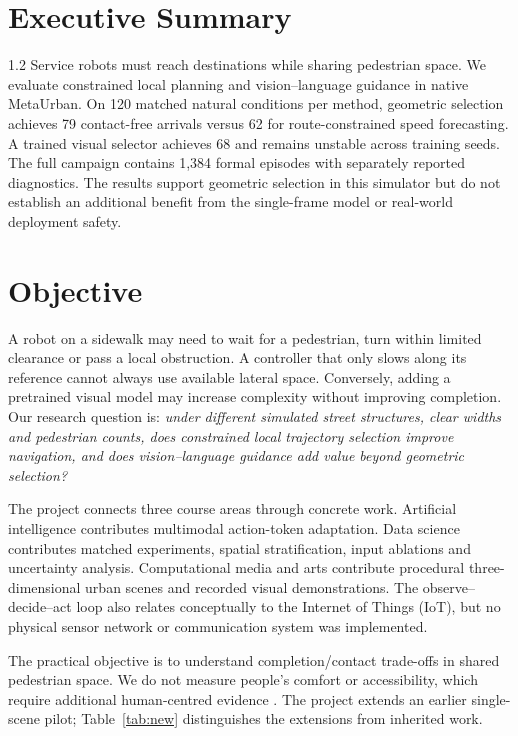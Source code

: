 \documentclass[a4paper,12pt]{article}
\begin{document}
\section*{Executive Summary}
\begin{spacing}{1.2}
Service robots must reach destinations while sharing pedestrian space. We evaluate constrained local planning and vision--language guidance in native MetaUrban. On 120 matched natural conditions per method, geometric selection achieves 79 contact-free arrivals versus 62 for route-constrained speed forecasting. A trained visual selector achieves 68 and remains unstable across training seeds. The full campaign contains 1,384 formal episodes with separately reported diagnostics. The results support geometric selection in this simulator but do not establish an additional benefit from the single-frame model or real-world deployment safety.
\end{spacing}
\newpage

\section{Objective}
A robot on a sidewalk may need to wait for a pedestrian, turn within limited clearance or pass a local obstruction. A controller that only slows along its reference cannot always use available lateral space. Conversely, adding a pretrained visual model may increase complexity without improving completion. Our research question is: \emph{under different simulated street structures, clear widths and pedestrian counts, does constrained local trajectory selection improve navigation, and does vision--language guidance add value beyond geometric selection?}

The project connects three course areas through concrete work. Artificial intelligence contributes multimodal action-token adaptation. Data science contributes matched experiments, spatial stratification, input ablations and uncertainty analysis. Computational media and arts contribute procedural three-dimensional urban scenes and recorded visual demonstrations. The observe--decide--act loop also relates conceptually to the Internet of Things (IoT), but no physical sensor network or communication system was implemented.

The practical objective is to understand completion/contact trade-offs in shared pedestrian space. We do not measure people's comfort or accessibility, which require additional human-centred evidence \cite{francis}. The project extends an earlier single-scene pilot; Table~\ref{tab:new} distinguishes the extensions from inherited work.
\end{document}

